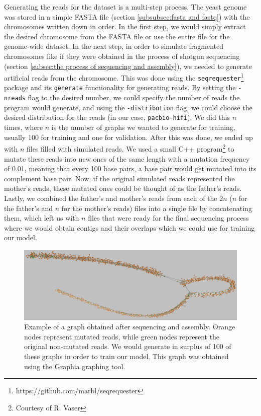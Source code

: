 \documentclass[times, utf8, diplomski, english]{fer_eng}
\begin{document}
Generating the reads for the dataset is a multi-step process. The yeast genome was stored in a simple FASTA file (section \ref{subsubsec:fasta and fastq}) with the chromosomes written down in order. In the first step, we would simply extract the desired chromosome from the FASTA file or use the entire file for the genome-wide dataset. In the next step, in order to simulate fragmented chromosomes like if they were obtained in the process of shotgun sequencing (section \ref{subsec:the process of sequencing and assembly}), we needed to generate artificial reads from the chromosome. This was done using the \texttt{seqrequester}\footnote{https://github.com/marbl/seqrequester} package and its \texttt{generate} functionality for generating reads. By setting the \texttt{-nreads} flag to the desired number, we could specify the number of reads the program would generate, and using the \texttt{-distribution} flag, we could choose the desired distribution for the reads (in our case, \texttt{pacbio-hifi}). We did this $n$ times, where $n$ is the number of graphs we wanted to generate for training, usually 100 for training and one for validation. After this was done, we ended up with $n$ files filled with simulated reads. We used a small C++ program\footnote{Courtesy of R. Vaser} to mutate these reads into new ones of the same length with a mutation frequency of 0.01, meaning that every 100 base pairs, a base pair would get mutated into its complement base pair. Now, if the original simulated reads represented the mother's reads, these mutated ones could be thought of as the father's reads. Lastly, we combined the father's and mother's reads from each of the $2n$ ($n$ for the father's and $n$ for the mother's reads) files into a single file by concatenating them, which left us with $n$ files that were ready for the final sequencing process where we would obtain contigs and their overlaps which we could use for training our model.

\begin{figure}[h]
	\centering
	\includegraphics[width=\textwidth]{images/graph_example.png}
	\caption[Graph]{Example of a graph obtained after sequencing and assembly. Orange nodes represent mutated reads, while green nodes represent the original non-mutated reads. We would generate in surplus of 100 of these graphs in order to train our model. This graph was obtained using the Graphia\footnotemark{} graphing tool.}
	\label{fig:graph}
\end{figure}
\end{document}
